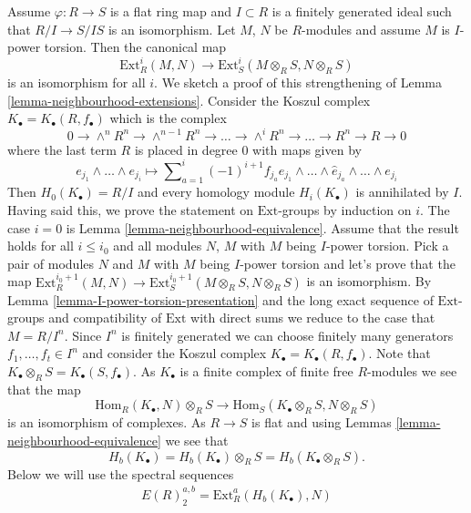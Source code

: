 \begin{remark}
\label{remark-neighbourhood-extensions}
Assume $\varphi : R \to S$ is a flat ring map and $I \subset R$ is a
finitely generated ideal such that $R/I \to S/IS$ is an isomorphism.
Let $M$, $N$ be $R$-modules and assume $M$ is $I$-power torsion.
Then the canonical map
$$
\text{Ext}^i_R(M, N)
\longrightarrow
\text{Ext}^i_S(M \otimes_R S, N \otimes_R S)
$$
is an isomorphism for all $i$. We sketch a proof of this strengthening of
Lemma \ref{lemma-neighbourhood-extensions}.
Consider the Koszul complex $K_\bullet = K_\bullet(R, f_\bullet)$ which is
the complex
$$
0 \to \wedge^n R^n \to \wedge^{n-1} R^n \to
\ldots \to \wedge^i R^n \to \ldots \to R^n \to R \to 0
$$
where the last term $R$ is placed in degree $0$ with maps given by
$$
e_{j_1} \wedge \ldots \wedge e_{j_i}
\longmapsto
\sum\nolimits_{a = 1}^i (-1)^{i + 1} f_{j_a} e_{j_1} \wedge \ldots
\wedge \hat e_{j_a} \wedge \ldots \wedge e_{j_i}
$$
Then $H_0(K_\bullet) = R/I$ and every homology module $H_i(K_\bullet)$
is annihilated by $I$. Having said this, we prove the statement
on $\text{Ext}$-groups by induction on $i$. The case $i = 0$ is
Lemma \ref{lemma-neighbourhood-equivalence}.
Assume that the result holds for all $i \leq i_0$ and all modules
$N$, $M$ with $M$ being $I$-power torsion. Pick a pair of modules
$N$ and $M$ with $M$ being $I$-power torsion and let's prove that
the map
$\text{Ext}^{i_0 + 1}_R(M, N) \to
\text{Ext}^{i_0 + 1}_S(M \otimes_R S, N \otimes_R S)$
is an isomorphism. By
Lemma \ref{lemma-I-power-torsion-presentation}
and the long exact sequence of $\text{Ext}$-groups and compatibility of
$\text{Ext}$ with direct sums we reduce to the case that $M = R/I^n$.
Since $I^n$ is finitely generated we can choose finitely many generators
$f_1, \ldots, f_t \in I^n$ and consider the Koszul complex
$K_\bullet = K_\bullet(R, f_\bullet)$. Note that
$K_\bullet \otimes_R S = K_\bullet(S, f_\bullet)$.
As $K_\bullet$ is a finite complex of finite free $R$-modules we
see that the map
\begin{equation}
\label{equation-comparison}
\text{Hom}_R(K_\bullet, N) \otimes_R S
\longrightarrow
\text{Hom}_S(K_\bullet \otimes_R S, N \otimes_R S)
\end{equation}
is an isomorphism of complexes. As $R \to S$ is flat and using
Lemmas \ref{lemma-neighbourhood-equivalence}
we see that
$$
H_b(K_\bullet) = H_b(K_\bullet) \otimes_R S = H_b(K_\bullet \otimes_R S).
$$
Below we will use the spectral sequences
\begin{align*}
E(R)_2^{a, b} = \text{Ext}^a_R(H_b(K_\bullet), N)

\end{align*}
\end{remark}
